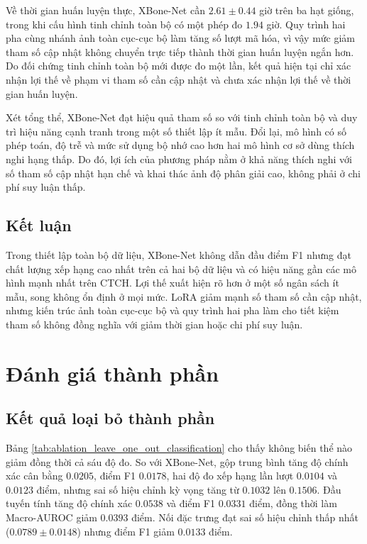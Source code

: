

Về thời gian huấn luyện thực, XBone-Net cần $2{.}61\pm0{.}44$ giờ trên ba hạt giống, trong khi cấu hình tinh chỉnh toàn bộ có một phép đo $1{.}94$ giờ. Quy trình hai pha cùng nhánh ảnh toàn cục-cục bộ làm tăng số lượt mã hóa, vì vậy mức giảm tham số cập nhật không chuyển trực tiếp thành thời gian huấn luyện ngắn hơn. Do đối chứng tinh chỉnh toàn bộ mới được đo một lần, kết quả hiện tại chỉ xác nhận lợi thế về phạm vi tham số cần cập nhật và chưa xác nhận lợi thế về thời gian huấn luyện.

Xét tổng thể, XBone-Net đạt hiệu quả tham số so với tinh chỉnh toàn bộ và duy trì hiệu năng cạnh tranh trong một số thiết lập ít mẫu. Đổi lại, mô hình có số phép toán, độ trễ và mức sử dụng bộ nhớ cao hơn hai mô hình cơ sở dùng thích nghi hạng thấp. Do đó, lợi ích của phương pháp nằm ở khả năng thích nghi với số tham số cập nhật hạn chế và khai thác ảnh độ phân giải cao, không phải ở chi phí suy luận thấp.

\subsection{Kết luận}
Trong thiết lập toàn bộ dữ liệu, XBone-Net không dẫn đầu điểm F1 nhưng đạt chất lượng xếp hạng cao nhất trên cả hai bộ dữ liệu và có hiệu năng gần các mô hình mạnh nhất trên CTCH. Lợi thế xuất hiện rõ hơn ở một số ngân sách ít mẫu, song không ổn định ở mọi mức. LoRA giảm mạnh số tham số cần cập nhật, nhưng kiến trúc ảnh toàn cục-cục bộ và quy trình hai pha làm cho tiết kiệm tham số không đồng nghĩa với giảm thời gian hoặc chi phí suy luận.

\section{Đánh giá thành phần}
\label{sec:component_evaluation_results}
\label{subsec:component_evaluation}
\label{subsec:rq2_component_results}

\subsection{Kết quả loại bỏ thành phần}
Bảng \ref{tab:ablation_leave_one_out_classification} cho thấy không biến thể nào giảm đồng thời cả sáu độ đo. So với XBone-Net, gộp trung bình tăng độ chính xác cân bằng $0{.}0205$, điểm F1 $0{.}0178$, hai độ đo xếp hạng lần lượt $0{.}0104$ và $0{.}0123$ điểm, nhưng sai số hiệu chỉnh kỳ vọng tăng từ $0{.}1032$ lên $0{.}1506$. Đầu tuyến tính tăng độ chính xác $0{.}0538$ và điểm F1 $0{.}0331$ điểm, đồng thời làm Macro-AUROC giảm $0{.}0393$ điểm. Nối đặc trưng đạt sai số hiệu chỉnh thấp nhất ($0{.}0789\pm0{.}0148$) nhưng điểm F1 giảm $0{.}0133$ điểm.

